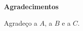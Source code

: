 
\cleardoublepage\thispagestyle{empty}

\begin{otherlanguage}{portuguese}
  \textbf{\Large Agradecimentos}

  Agradeço a $A$, a $B$ e a $C$.
\end{otherlanguage}

